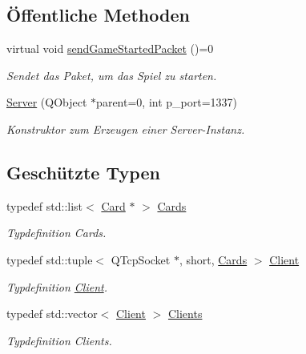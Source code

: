 \subsection*{Öffentliche Methoden}
\begin{DoxyCompactItemize}
\item 
virtual void \hyperlink{class_server_a1be346a3252468e445f8f809d1c912e7}{send\+Game\+Started\+Packet} ()=0
\begin{DoxyCompactList}\small\item\em Sendet das Paket, um das Spiel zu starten. \end{DoxyCompactList}\item 
\hyperlink{class_server_a9fc4c94bf5687657b7d1eea35334ed44}{Server} (Q\+Object $\ast$parent=0, int p\+\_\+port=1337)
\begin{DoxyCompactList}\small\item\em Konstruktor zum Erzeugen einer Server-\/\+Instanz. \end{DoxyCompactList}\end{DoxyCompactItemize}
\subsection*{Geschützte Typen}
\begin{DoxyCompactItemize}
\item 
typedef std\+::list$<$ \hyperlink{class_card}{Card} $\ast$ $>$ \hyperlink{class_server_a2b2ff2c4678bdca3599c3feb5efdaff7}{Cards}
\begin{DoxyCompactList}\small\item\em Typdefinition Cards. \end{DoxyCompactList}\item 
typedef std\+::tuple$<$ Q\+Tcp\+Socket $\ast$, short, \hyperlink{class_server_a2b2ff2c4678bdca3599c3feb5efdaff7}{Cards} $>$ \hyperlink{class_server_a31786b51863a753101d409d1e14c0b9a}{Client}
\begin{DoxyCompactList}\small\item\em Typdefinition \hyperlink{class_client}{Client}. \end{DoxyCompactList}\item 
typedef std\+::vector$<$ \hyperlink{class_server_a31786b51863a753101d409d1e14c0b9a}{Client} $>$ \hyperlink{class_server_a2642184a6bcfa2be2b0670e27dcf1e18}{Clients}
\begin{DoxyCompactList}\small\item\em Typdefinition Clients. \end{DoxyCompactList}\end{DoxyCompactItemize}
